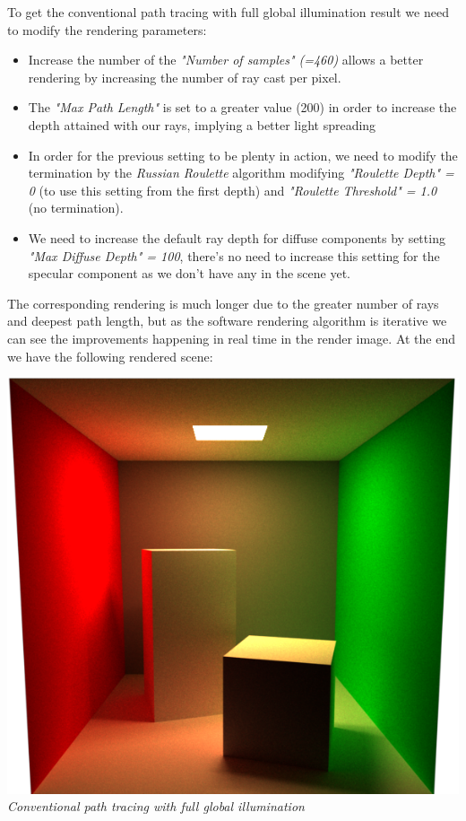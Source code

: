 \documentclass[a4,12pt]{article}
\begin{document}
	To get the conventional path tracing with full global illumination result we need to modify the rendering parameters:
	\begin{itemize}
		\item Increase the number of the \textit{"Number of samples" (=460)} allows a better rendering by increasing the number of ray cast per pixel.
		\item The \textit{"Max Path Length"} is set to a greater value (200) in order to increase the depth attained with our rays, implying a better light spreading
		\item In order for the previous setting to be plenty in action, we need to modify the termination by the \textit{Russian Roulette} algorithm modifying \textit{"Roulette Depth" = 0} (to use this setting from the first depth) and \textit{"Roulette Threshold" = 1.0} (no termination).
		\item We need to increase the default ray depth for diffuse components by setting \textit{"Max Diffuse Depth" = 100}, there's no need to increase this setting for the specular component as we don't have any in the scene yet.
	\end{itemize}
	The corresponding rendering is much longer due to the greater number of rays and deepest path length, but as the software rendering algorithm is iterative we can see the improvements happening in real time in the render image. At the end we have the following rendered scene:
	
	\begin{center}
		\begin{minipage}[b]{0.4\linewidth}
			\begin{center}
				\includegraphics[width = \textwidth]{./Worksheet9/conventionalPathTracingRenderC.png}\\
				\textit{Conventional path tracing with full global illumination}\\
			\end{center}
		\end{minipage}
	\end{center}
	
\end{document}
